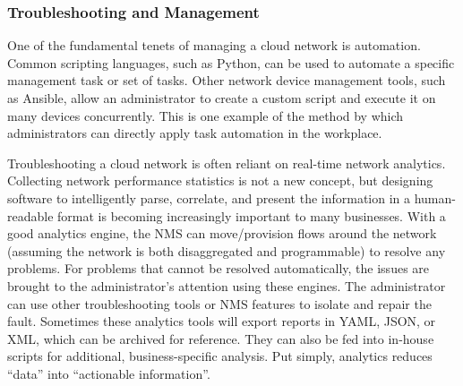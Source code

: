 \subsubsection{Troubleshooting and Management}
One of the fundamental tenets of managing a cloud network is automation.
Common scripting languages, such as Python, can be used to automate a specific
management task or set of tasks. Other network device management tools, such
as Ansible, allow an administrator to create a custom script and execute it on
many devices concurrently. This is one example of the method by which
administrators can directly apply task automation in the workplace.

Troubleshooting a cloud network is often reliant on real-time network
analytics. Collecting network performance statistics is not a new concept, but
designing software to intelligently parse, correlate, and present the
information in a human-readable format is becoming increasingly important to
many businesses. With a good analytics engine, the NMS can move/provision
flows around the network (assuming the network is both disaggregated and
programmable) to resolve any problems. For problems that cannot be resolved
automatically, the issues are brought to the administrator’s attention using
these engines. The administrator can use other troubleshooting tools or NMS
features to isolate and repair the fault. Sometimes these analytics tools will
export reports in YAML, JSON, or XML, which can be archived for reference.
They can also be fed into in-house scripts for additional, business-specific
analysis. Put simply, analytics reduces ``data'' into ``actionable information''.
